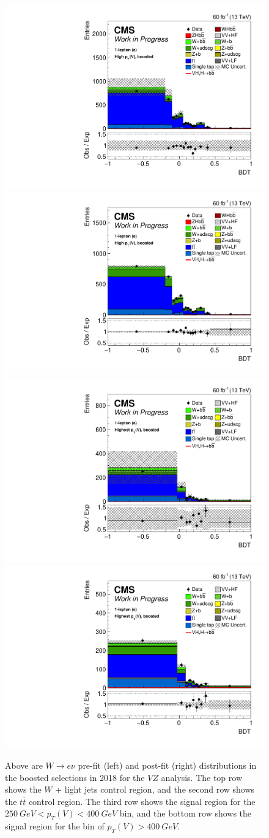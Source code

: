 \begin{figure}
  \includegraphics[width=0.35\linewidth]{figures/210323_STXS_VZ_unblinded_XbbVZ_8fe9e9cd_postfitplots/plot_shapes_vhbb_Wen_22_13TeV2018_prefit}
  \includegraphics[width=0.35\linewidth]{figures/210323_STXS_VZ_unblinded_XbbVZ_8fe9e9cd_postfitplots/plot_shapes_vhbb_Wen_22_13TeV2018_postfit} \\
  \includegraphics[width=0.35\linewidth]{figures/210323_STXS_VZ_unblinded_XbbVZ_8fe9e9cd_postfitplots/plot_shapes_vhbb_Wen_24_13TeV2018_prefit}
  \includegraphics[width=0.35\linewidth]{figures/210323_STXS_VZ_unblinded_XbbVZ_8fe9e9cd_postfitplots/plot_shapes_vhbb_Wen_24_13TeV2018_postfit} \\
  \caption[$W\rightarrow e\nu$ $V\!Z$ distributions for the boosted selection in 2018]{
    Above are $W\rightarrow e\nu$ pre-fit (left) and post-fit (right) distributions in the boosted selections in 2018
    for the $V\!Z$ analysis.
    The top row shows the $W$ + light jets control region,
    and the second row shows the  $t\bar{t}$ control region.
    The third row shows the signal region for the $\SI{250}{GeV} < p_T(V) < \SI{400}{GeV}$ bin,
    and the bottom row shows the signal region for the bin of $p_T(V)
    > \SI{400}{GeV}$.
  }
  \label{fig:vz-wen-boost-2018}
\end{figure}

